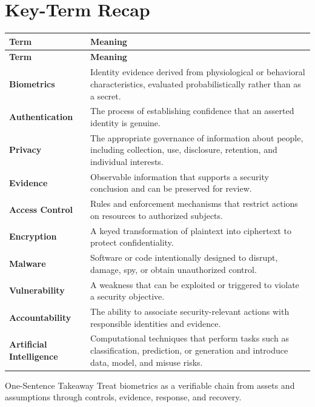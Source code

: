 \documentclass[11pt,letterpaper]{article}
\begin{document}
\section*{Key-Term Recap}
\begin{longtable}{>{\raggedright\arraybackslash}p{}>{\raggedright\arraybackslash}p{}}
\toprule\rowcolor{Navy}\color{white}\textbf{Term} & \color{white}\textbf{Meaning}\\\midrule
\endfirsthead
\toprule\rowcolor{Navy}\color{white}\textbf{Term} & \color{white}\textbf{Meaning}\\\midrule
\endhead
\textbf{Biometrics} & Identity evidence derived from physiological or behavioral characteristics, evaluated probabilistically rather than as a secret. \\\midrule
\textbf{Authentication} & The process of establishing confidence that an asserted identity is genuine. \\\midrule
\textbf{Privacy} & The appropriate governance of information about people, including collection, use, disclosure, retention, and individual interests. \\\midrule
\textbf{Evidence} & Observable information that supports a security conclusion and can be preserved for review. \\\midrule
\textbf{Access Control} & Rules and enforcement mechanisms that restrict actions on resources to authorized subjects. \\\midrule
\textbf{Encryption} & A keyed transformation of plaintext into ciphertext to protect confidentiality. \\\midrule
\textbf{Malware} & Software or code intentionally designed to disrupt, damage, spy, or obtain unauthorized control. \\\midrule
\textbf{Vulnerability} & A weakness that can be exploited or triggered to violate a security objective. \\\midrule
\textbf{Accountability} & The ability to associate security-relevant actions with responsible identities and evidence. \\\midrule
\textbf{Artificial Intelligence} & Computational techniques that perform tasks such as classification, prediction, or generation and introduce data, model, and misuse risks. \\\midrule
\bottomrule
\end{longtable}
\begin{CornellExamBox}{One-Sentence Takeaway}
Treat biometrics as a verifiable chain from assets and assumptions through controls, evidence, response, and recovery.
\end{CornellExamBox}
\end{document}
